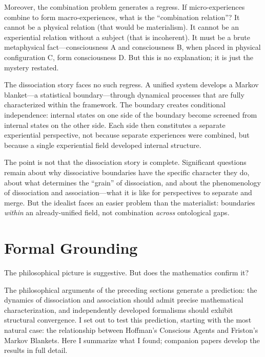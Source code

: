 \documentclass[11pt,a4paper]{article}
\theoremstyle{definition}
\theoremstyle{plain}
\theoremstyle{remark}
\begin{document}
Moreover, the combination problem generates a regress. If micro-experiences combine to form macro-experiences, what is the ``combination relation''? It cannot be a physical relation (that would be materialism). It cannot be an experiential relation without a subject (that is incoherent). It must be a brute metaphysical fact---consciousness A and consciousness B, when placed in physical configuration C, form consciousness D. But this is no explanation; it is just the mystery restated.

The dissociation story faces no such regress. A unified system develops a Markov blanket---a statistical boundary---through dynamical processes that are fully characterized within the framework. The boundary creates conditional independence: internal states on one side of the boundary become screened from internal states on the other side. Each side then constitutes a separate experiential perspective, not because separate experiences were combined, but because a single experiential field developed internal structure.

The point is not that the dissociation story is complete. Significant questions remain about why dissociative boundaries have the specific character they do, about what determines the ``grain'' of dissociation, and about the phenomenology of dissociation and association---what it is like for perspectives to separate and merge. But the idealist faces an easier problem than the materialist: boundaries \textit{within} an already-unified field, not combination \textit{across} ontological gaps.

\section{Formal Grounding}\label{sec:formal}

The philosophical picture is suggestive. But does the mathematics confirm it?

The philosophical arguments of the preceding sections generate a prediction: the dynamics of dissociation and association should admit precise mathematical characterization, and independently developed formalisms should exhibit structural convergence. I set out to test this prediction, starting with the most natural case: the relationship between Hoffman's Conscious Agents and Friston's Markov Blankets. Here I summarize what I found; companion papers develop the results in full detail.
\end{document}
